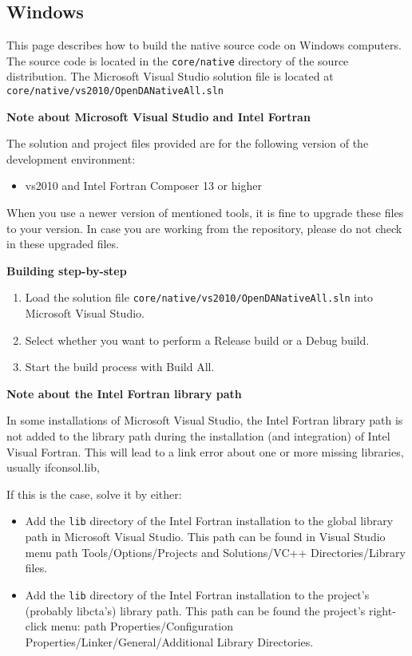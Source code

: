 \subsection{Windows}
\label{dc:build:windows}

This page describes how to build the \oda native source code on Windows computers. The source code is located in the \verb|core/native| directory of the source distribution. The Microsoft Visual Studio solution file is located at \verb|core/native/vs2010/OpenDANativeAll.sln|

\textbf{Note about Microsoft Visual Studio and Intel Fortran}

The solution and project files provided are for the following version of the development environment:

\begin{itemize}
	\item vs2010 and Intel Fortran Composer 13 or higher
\end{itemize}

When you use a newer version of mentioned tools, it is fine to upgrade these files to your version. In case you are working from the repository, please do not check in these upgraded files. 

\textbf{Building step-by-step}

\begin{enumerate}
	\item Load the solution file \verb|core/native/vs2010/OpenDANativeAll.sln| into Microsoft Visual Studio.
	\item Select whether you want to perform a Release build or a Debug build.
	\item Start the build process with Build All.
\end{enumerate}

\textbf{Note about the Intel Fortran library path}

In some installations of Microsoft Visual Studio, the Intel Fortran library path is not added to the library path during the installation (and integration) of Intel Visual Fortran. This will lead to a link error about one or more missing libraries, usually ifconsol.lib,

If this is the case, solve it by either:

\begin{itemize}
	\item Add the \verb|lib| directory of the Intel Fortran installation to the global library path in Microsoft Visual Studio. This path can be found in Visual Studio menu path Tools/Options/Projects and Solutions/VC++ Directories/Library files.
	\item Add the \verb|lib| directory of the Intel Fortran installation to the project's (probably libcta's) library path. This path can be found the project's right-click menu: path Properties/Configuration Properties/Linker/General/Additional Library Directories.
\end{itemize}
    
    
